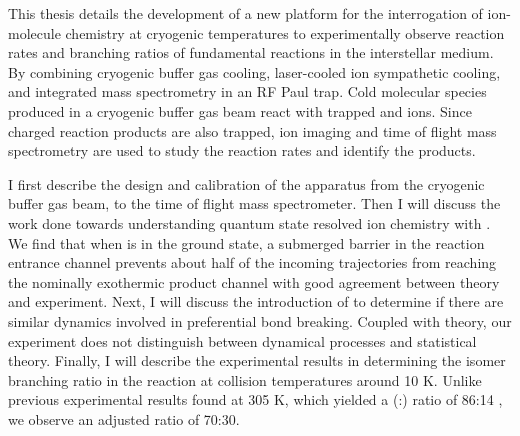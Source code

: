 This thesis details the development of a new platform for the interrogation of ion-molecule chemistry at cryogenic temperatures to experimentally observe reaction rates and branching ratios of fundamental reactions in the interstellar medium. By combining cryogenic buffer gas cooling, laser-cooled ion sympathetic cooling, and integrated mass spectrometry in an RF Paul trap. Cold molecular species produced in a cryogenic buffer gas beam react with trapped  and  ions. Since charged reaction products are also trapped, ion imaging and time of flight mass spectrometry are used to study the reaction rates and identify the products.

I first describe the design and calibration of the apparatus from the cryogenic buffer gas beam, to the time of flight mass spectrometer. Then I will discuss the work done towards understanding quantum state resolved  ion chemistry with . We find that when  is in the ground state, a submerged barrier in the reaction entrance channel prevents about half of the incoming trajectories from reaching the nominally exothermic product channel with good agreement between theory and experiment. Next, I will discuss the introduction of  to determine if there are similar dynamics involved in preferential bond breaking. Coupled with theory, our experiment does not distinguish between dynamical processes and statistical theory. Finally, I will describe the experimental results in determining the isomer branching ratio in the  reaction at collision temperatures around 10 K. Unlike previous experimental results found at 305 K, which yielded a (:) ratio of 86:14 \cite{Love1987}, we observe an adjusted ratio of 70:30.